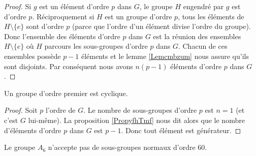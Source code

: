 \begin{proof}
    Si \( g\) est un élément d'ordre \( p\) dans \( G\), le groupe \( H\) engendré par \( g\) est d'ordre \( p\). Réciproquement si \( H\) est un groupe d'ordre \( p\), tous les éléments de \( H\setminus\{ e \}\) sont d'ordre \( p\) (parce que l'ordre d'un élément divise l'ordre du groupe). Donc l'ensemble des éléments d'ordre \( p\) dans \( G\) est la réunion des ensembles \( H\setminus\{ e \}\) où \( H\) parcours les sous-groupes d'ordre \( p\) dans \( G\). Chacun de ces ensembles possède \( p-1\) éléments et le lemme \ref{Lemcmbzum} nous assure qu'ils sont disjoints. Par conséquent nous avons \( n(p-1)\) éléments d'ordre \( p\) dans \( G\).
\end{proof}

\begin{corollary}
    Un groupe d'ordre premier est cyclique.
\end{corollary}

\begin{proof}
    Soit \( p\) l'ordre de \( G\). Le nombre de sous-groupes d'ordre \( p\) est \( n=1\) (et c'est \( G\) lui-même). La proposition \ref{PropyfhTmf} nous dit alors que le nombre d'éléments d'ordre \( p\) dans \( G\) est \( p-1\). Donc tout élément est générateur.
\end{proof}

\begin{lemma}       \label{LEMooICEHooGSSpkq}
    Le groupe \( A_6\) n'accepte pas de sous-groupes normaux d'ordre \( 60\).
\end{lemma}

